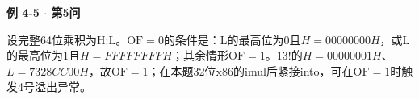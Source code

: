 {\color{ink}\bfseries 例 4-5 \(\cdot \) 第5问}\par\vspace{1bp}设完整64位乘积为H:L。\(\mathrm{OF}=\allowbreak{}0\)的条件是：L的最高位为0且\(H=\allowbreak{}00000000H\)，或L的最高位为1且\(H=\allowbreak{}FFFFFFFFH\)；其余情形\(\mathrm{OF}=\allowbreak{}1\)。13!的\(H=\allowbreak{}00000001H\)、\(L=\allowbreak{}7328CC00H\)，故\(\mathrm{OF}=\allowbreak{}1\)；在本题32位x86的imul后紧接into，可在\(\mathrm{OF}=\allowbreak{}1\)时触发4号溢出异常。

